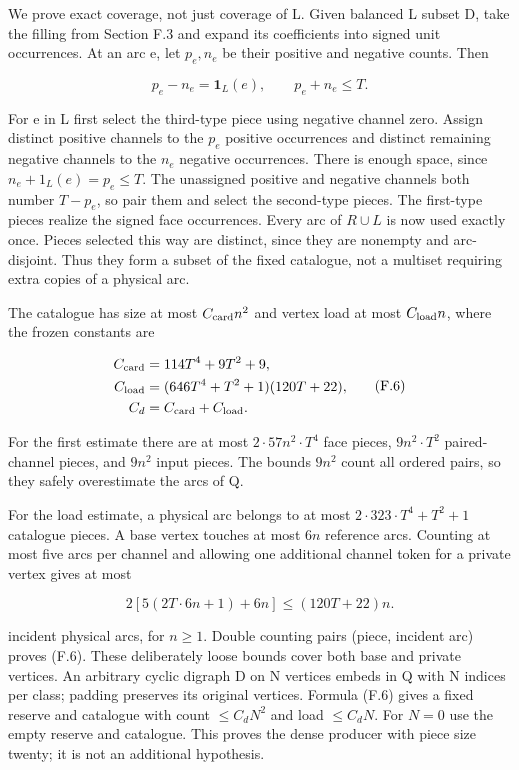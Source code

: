 \documentclass[english,11pt,a4paper]{article}
\newcounter{none}
\begin{document}
We prove exact coverage, not just coverage of L. Given balanced L subset D, take the filling from Section F.3 and expand its coefficients into signed unit occurrences. At an arc e, let \(p_{e},n_{e}\) be their positive and negative counts. Then

\[p_e-n_e=\mathbf1_L(e),\qquad p_e+n_e\le T.\]

For e in L first select the third-type piece using negative channel zero. Assign distinct positive channels to the \(p_{e}\) positive occurrences and distinct remaining negative channels to the \(n_{e}\) negative occurrences. There is enough space, since \(n_{e}+1_{L}(e)=p_{e}\le T\). The unassigned positive and negative channels both number \(T-p_{e}\), so pair them and select the second-type pieces. The first-type pieces realize the signed face occurrences. Every arc of \(R\cup L\) is now used exactly once. Pieces selected this way are distinct, since they are nonempty and arc-disjoint. Thus they form a subset of the fixed catalogue, not a multiset requiring extra copies of a physical arc.

The catalogue has size at most \(C_{\rm card}n^2\) and vertex load at most \(C_{\rm load}n\), where the frozen constants are

\[\begin{aligned}C_{\rm card}&=114T^4+9T^2+9,\\C_{\rm load}&=(646T^4+T^2+1)(120T+22),\\C_d&=C_{\rm card}+C_{\rm load}.\end{aligned}\tag{F.6}\]

For the first estimate there are at most \(2\cdot 57n^{2}\cdot T^{4}\) face pieces, \(9n^{2}\cdot T^{2}\) paired-channel pieces, and \(9n^{2}\) input pieces. The bounds \(9n^{2}\) count all ordered pairs, so they safely overestimate the arcs of Q.

For the load estimate, a physical arc belongs to at most \(2\cdot 323\cdot T^{4}+T^{2}+1\) catalogue pieces. A base vertex touches at most \(6n\) reference arcs. Counting at most five arcs per channel and allowing one additional channel token for a private vertex gives at most

\[2[5(2T\cdot6n+1)+6n]\le(120T+22)n.\]

incident physical arcs, for \(n\ge 1\). Double counting pairs (piece, incident arc) proves (F.6). These deliberately loose bounds cover both base and private vertices. An arbitrary cyclic digraph D on N vertices embeds in Q with N indices per class; padding preserves its original vertices. Formula (F.6) gives a fixed reserve and catalogue with count \(\le C_dN^2\) and load \(\le C_dN\). For \(N=0\) use the empty reserve and catalogue. This proves the dense producer with piece size twenty; it is not an additional hypothesis.
\end{document}
